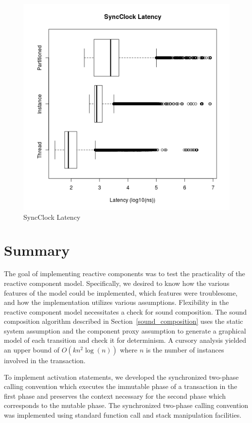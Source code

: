 \begin{figure}
\center
\includegraphics[height=.4\textheight]{sync_latency_box.png}
\caption{SyncClock Latency}
\label{sync_latency_box}
\end{figure}

\clearpage

\section{Summary}

The goal of implementing reactive components was to test the practicality of the reactive component model.
Specifically, we desired to know how the various features of the model could be implemented, which features were troublesome, and how the implementation utilizes various assumptions.
Flexibility in the reactive component model necessitates a check for sound composition.
The sound composition algorithm described in Section~\ref{sound_composition} uses the static system assumption and the component proxy assumption to generate a graphical model of each transition and check it for determinism.
A cursory analysis yielded an upper bound of $O(k n^2 \log (n))$ where $n$ is the number of instances involved in the transaction.

To implement activation statements, we developed the synchronized two-phase calling convention which executes the immutable phase of a transaction in the first phase and preserves the context necessary for the second phase which corresponds to the mutable phase.
The synchronized two-phase calling convention was implemented using standard function call and stack manipulation facilities.

